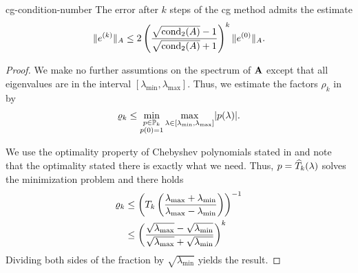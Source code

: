 \begin{Corollary}{cg-condition-number}
  The error after $k$ steps of the cg method admits the estimate
  \begin{gather}
    \lVert e^{(k)}\rVert_A \le 2 \left(
      \frac{\sqrt{\operatorname{cond}_2(A)}-1}{\sqrt{\operatorname{cond}_2(A)}+1}\right)^k
    \lVert e^{(0)}\rVert_A.
  \end{gather}
\end{Corollary}

\begin{proof}
  We make no further assumtions on the spectrum of $\mathbf A$ except that
  all eigenvalues are in the interval
  $[\lambda_{\min},\lambda_{\max}]$. Thus, we estimate the factors $\rho_k$ in  by
  \begin{gather}
    \varrho_k \le \min_{\substack{p\in\mathbb P_k\\p(0) = 1}}
    \max_{\lambda\in[\lambda_{\min},\lambda_{\max}]} \lvert p(\lambda)\rvert.
  \end{gather}
  
  We use the optimality property of Chebyshev polynomials stated in
   and note that the
  optimality stated there is exactly what we need. Thus,
  $p = \widehat{T}_k(\lambda)$ solves the minimization
  problem and there holds
  \begin{align}
    \varrho_k
    &\le \left(T_k\left(
      \frac{\lambda_{\max}+\lambda_{\min}}{\lambda_{\max}-\lambda_{\min}}
      \right)\right)^{-1}\\
    & \le \left(\frac{\sqrt{\lambda_{\max}}-\sqrt{\lambda_{\min}}}{\sqrt{\lambda_{\max}}+\sqrt{\lambda_{\min}}}
      \right)^k
  \end{align}
  Dividing both sides of the fraction by $\sqrt{\lambda_{\min}}$ yields the result.
\end{proof}


